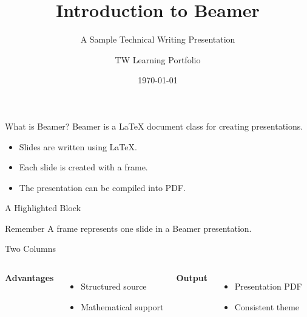 \documentclass{beamer}
\title{Introduction to Beamer}
\subtitle{A Sample Technical Writing Presentation}
\author{TW Learning Portfolio}
\institute{MNIT Jaipur}
\date{\today}
\begin{document}
\begin{frame}
    \titlepage
\end{frame}

\begin{frame}{What is Beamer?}
    Beamer is a LaTeX document class for creating presentations.
    \begin{itemize}
        \item Slides are written using LaTeX.
        \item Each slide is created with a frame.
        \item The presentation can be compiled into PDF.
    \end{itemize}
\end{frame}

\begin{frame}{A Highlighted Block}
    \begin{block}{Remember}
        A frame represents one slide in a Beamer presentation.
    \end{block}
\end{frame}

\begin{frame}{Two Columns}
    \begin{columns}
        \textbf{Advantages}
        \begin{itemize}
            \item Structured source
            \item Mathematical support
        \end{itemize}

        \textbf{Output}
        \begin{itemize}
            \item Presentation PDF
            \item Consistent theme
        \end{itemize}
    \end{columns}
\end{frame}
\end{document}

